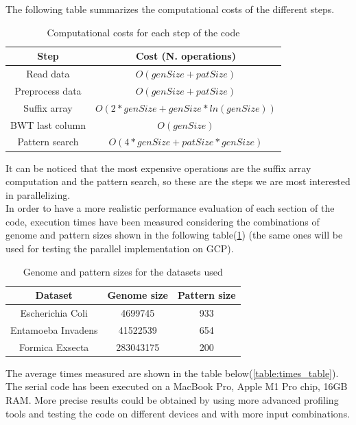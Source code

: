 \documentclass[final,5p,times,twocolumn,authoryear]{elsarticle}
\begin{document}
The following table summarizes the computational costs of the different steps.
\begin{table}[H]
\begin{center}
\begin{tabular}{|| c c ||}
\hline
Step & Cost (N. operations) \\
\hline
Read data & $O(genSize + patSize)$ \\ 
Preprocess data & $O(genSize + patSize)$ \\  
Suffix array & $O(2*genSize + genSize*ln(genSize))$ \\
BWT last column & $O(genSize)$ \\
Pattern search & $O(4*genSize + patSize*genSize)$ \\
\hline
\end{tabular}
\caption{Computational costs for each step of the code}
\end{center}
\end{table}
It can be noticed that the most expensive operations are the suffix array computation and the pattern search, so these are the steps we are most interested in parallelizing. \\
In order to have a more realistic performance evaluation of each section of the code, execution times have been measured considering the combinations of genome and pattern sizes shown in the following table(\ref{table:datasets_table}) (the same ones will be used for testing the parallel implementation on GCP).
\begin{table}[H]
\begin{center}
\begin{tabular}{|| c c c ||}
\hline
Dataset & Genome size & Pattern size \\
\hline
Escherichia Coli & 4699745 & 933 \\
Entamoeba Invadens & 41522539 & 654 \\
Formica Exsecta & 283043175 & 200 \\
\hline
\end{tabular}
\end{center}
\caption{Genome and pattern sizes for the datasets used}
\vspace{-2mm}%
\label{table:datasets_table}
\end{table}
The average times measured are shown in the table below(\ref{table:times_table}). The serial code has been executed on a MacBook Pro, Apple M1 Pro chip, 16GB RAM. More precise results could be obtained by using more advanced profiling tools and testing the code on different devices and with more input combinations.
\end{document}
